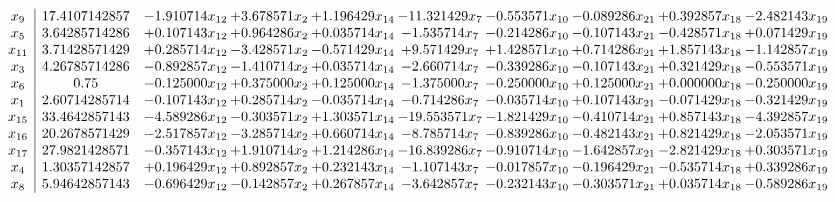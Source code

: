 \documentclass[10pt]{article}
\begin{document}
 \[\begin{array}{c| c c@{\hskip 2pt} c@{\hskip 2pt} c@{\hskip 2pt} c@{\hskip 2pt} c@{\hskip 2pt} c@{\hskip 2pt} c@{\hskip 2pt} c@{\hskip 2pt} }
 x_{9}   &  17.4107142857 & -1.910714 x_{12} & + 3.678571 x_{2} & + 1.196429 x_{14} & -11.321429 x_{7} & -0.553571 x_{10} & -0.089286 x_{21} & + 0.392857 x_{18} & -2.482143 x_{19}\\
 x_{5}   &  3.64285714286 & + 0.107143 x_{12} & + 0.964286 x_{2} & + 0.035714 x_{14} & -1.535714 x_{7} & -0.214286 x_{10} & -0.107143 x_{21} & -0.428571 x_{18} & + 0.071429 x_{19}\\
 x_{11}   &  3.71428571429 & + 0.285714 x_{12} & -3.428571 x_{2} & -0.571429 x_{14} & + 9.571429 x_{7} & + 1.428571 x_{10} & + 0.714286 x_{21} & + 1.857143 x_{18} & -1.142857 x_{19}\\
 x_{3}   &  4.26785714286 & -0.892857 x_{12} & -1.410714 x_{2} & + 0.035714 x_{14} & -2.660714 x_{7} & -0.339286 x_{10} & -0.107143 x_{21} & + 0.321429 x_{18} & -0.553571 x_{19}\\
 x_{6}   &  0.75 & -0.125000 x_{12} & + 0.375000 x_{2} & + 0.125000 x_{14} & -1.375000 x_{7} & -0.250000 x_{10} & + 0.125000 x_{21} & + 0.000000 x_{18} & -0.250000 x_{19}\\
 x_{1}   &  2.60714285714 & -0.107143 x_{12} & + 0.285714 x_{2} & -0.035714 x_{14} & -0.714286 x_{7} & -0.035714 x_{10} & + 0.107143 x_{21} & -0.071429 x_{18} & -0.321429 x_{19}\\
 x_{15}   &  33.4642857143 & -4.589286 x_{12} & -0.303571 x_{2} & + 1.303571 x_{14} & -19.553571 x_{7} & -1.821429 x_{10} & -0.410714 x_{21} & + 0.857143 x_{18} & -4.392857 x_{19}\\
 x_{16}   &  20.2678571429 & -2.517857 x_{12} & -3.285714 x_{2} & + 0.660714 x_{14} & -8.785714 x_{7} & -0.839286 x_{10} & -0.482143 x_{21} & + 0.821429 x_{18} & -2.053571 x_{19}\\
 x_{17}   &  27.9821428571 & -0.357143 x_{12} & + 1.910714 x_{2} & + 1.214286 x_{14} & -16.839286 x_{7} & -0.910714 x_{10} & -1.642857 x_{21} & -2.821429 x_{18} & + 0.303571 x_{19}\\
 x_{4}   &  1.30357142857 & + 0.196429 x_{12} & + 0.892857 x_{2} & + 0.232143 x_{14} & -1.107143 x_{7} & -0.017857 x_{10} & -0.196429 x_{21} & -0.535714 x_{18} & + 0.339286 x_{19}\\
 x_{8}   &  5.94642857143 & -0.696429 x_{12} & -0.142857 x_{2} & + 0.267857 x_{14} & -3.642857 x_{7} & -0.232143 x_{10} & -0.303571 x_{21} & + 0.035714 x_{18} & -0.589286 x_{19}\\

\end{array}\]
\end{document}
